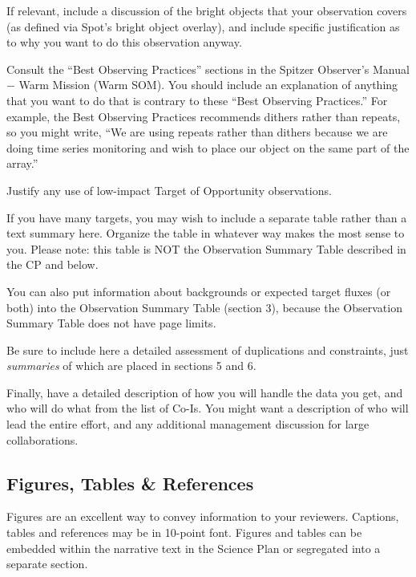 \documentclass[letterpaper,12pt]{article}
\begin{document}
If relevant, include a discussion of the bright objects that
your observation covers (as defined via Spot's bright object
overlay), and include specific justification as to why you
want to do this observation anyway.\newline

Consult the ``Best Observing
Practices'' sections in the Spitzer Observer's Manual $-$ Warm Mission
(Warm SOM). You should include an explanation of anything that you 
want to do that is contrary to these ``Best Observing Practices.''  For
example, the Best Observing Practices recommends dithers rather
than repeats, so you might write, ``We are using 
repeats rather than dithers because we are doing time series
monitoring and wish to place our object on the same part of the
array.''\newline

Justify any use of low-impact Target of Opportunity observations. \newline

If you have many targets, you may wish to include a separate 
table rather than a text summary here. Organize the
table in whatever way makes the most sense to you.   
Please note: this table is NOT the Observation
Summary Table described in the CP and below.  \newline

You can also put information about backgrounds or expected target 
fluxes (or both) into the Observation Summary Table (section
3), because the Observation Summary Table does not have page
limits.  \newline

Be sure to include here a detailed assessment of duplications and 
constraints, just {\em summaries} of which are placed in
sections 5 and 6.\newline

Finally, have a detailed description of how you will handle the
data you get, and who will do what from the list of Co-Is.  You
might want a description of who will lead the entire effort, and
any additional management discussion for large collaborations. 

\subsection{Figures, Tables \& References}

Figures are an excellent way to convey information to your reviewers.
Captions, tables and references may be in 10-point font.  Figures and tables 
can be embedded within the narrative text in the Science Plan or 
segregated into a separate section. \newline
\end{document}

